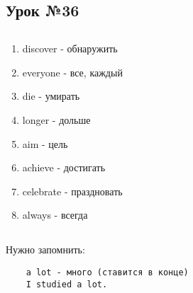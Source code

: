 \subsection{Урок №36}

\subsection*{}
\begin{multicols}{2}
    \begin{enumerate}\setlength{\itemsep}{0pt}
        \item discover - обнаружить
        \item everyone - все, каждый
        \item die - умирать
        \item longer - дольше
        \item aim - цель
        \item achieve - достигать
        \item celebrate - праздновать
        \item always - всегда
    \end{enumerate}
\end{multicols}

\subsection*{}
Нужно запомнить:
\begin{verbatim}
    a lot - много (ставится в конце)
    I studied a lot.
\end{verbatim}